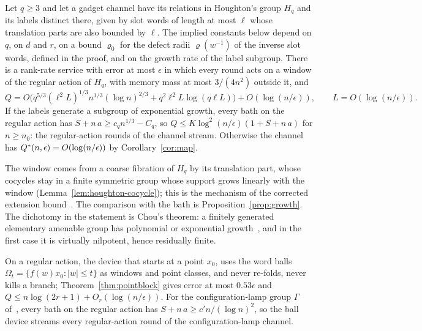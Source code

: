 \begin{theorem}\label{thm:houghton-groups}
Let $q\ge3$ and let a gadget channel have its relations in Houghton's group $H_q$ and its labels distinct there, given by slot words of length at
most $\ell$ whose translation parts are also bounded by $\ell$. The implied constants below depend on $q$, on $d$ and $r$, on a bound $\varrho_0$ for the defect
radii $\varrho(w^{-1})$ of the inverse slot words, defined in the proof, and on the growth rate of the label subgroup. There is a rank-rate service with error at most $\epsilon$ in which every round acts on a window of the regular action of $H_q$, with
memory mass at most $3/(4n^2)$ outside it, and
\[
Q=O\bigl(q^{5/3}(\ell^2L)^{1/3}n^{1/3}(\log n)^{2/3}+q^2\ell^2L\log(q\ell L)\bigr)+O(\log(n/\epsilon)),\qquad L=O(\log(n/\epsilon)).
\]
If the labels generate a subgroup of exponential growth, every bath on the regular action has $S+n\,a\ge c_qn^{1/3}-C_q$, so
$Q\le K\log^2(n/\epsilon)(1+S+n\,a)$ for $n\ge n_0$: the regular-action rounds of the channel stream. Otherwise the channel has
$Q^{*}(n,\epsilon)=O(\log(n/\epsilon))$ by Corollary~\ref{cor:map}.
\end{theorem}

The window comes from a coarse fibration of $H_q$ by its translation part, whose cocycles stay in a finite symmetric group whose support grows
linearly with the window (Lemma~\ref{lem:houghton-cocycle}); this is the mechanism of the corrected extension
bound~\cite[Proposition~7.1]{DouglasMghirbiA}. The comparison with the bath is Proposition~\ref{prop:growth}. The dichotomy in the
statement is Chou's theorem: a finitely generated elementary amenable group has polynomial or exponential growth~\cite[Theorem~3.2]{Chou1980},
and in the first case it is virtually nilpotent, hence residually finite.

\begin{proposition}\label{prop:ball}
On a regular action, the device that starts at a point $x_0$, uses the word balls $\Omega_t=\{f(w)x_0:|w|\le t\}$ as windows and point classes, and
never re-folds, never kills a branch; Theorem~\ref{thm:pointblock} gives error at most $0.53\epsilon$ and $Q\le n\log(2r+1)+O_r(\log(n/\epsilon))$. For
the configuration-lamp group $\Gamma$ of~\cite{DouglasMghirbiC}, every bath on the regular action has $S+n\,a\ge c'n/(\log n)^2$, so the ball device streams every
regular-action round of the configuration-lamp channel.
\end{proposition}

